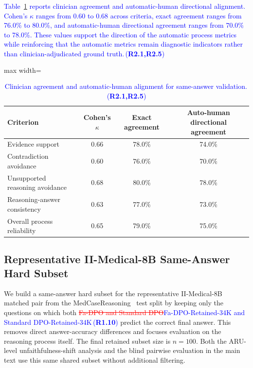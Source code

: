 \documentclass[a4paper,fleqn,doubleblind]{cas-sc}
\DeclareRobustCommand{\deleted}[1]{\textcolor{red}{\sout{#1}}}
\DeclareRobustCommand{\added}[1]{\textcolor{blue}{#1}}
\DeclareRobustCommand{\revtag}[1]{\textcolor{blue}{\scriptsize\,(\textbf{#1})}}
\begin{document}
\added{Table~\ref{tab:same_answer_clinician_alignment} reports clinician agreement and automatic-human directional alignment. Cohen's $\kappa$ ranges from 0.60 to 0.68 across criteria, exact agreement ranges from 76.0\% to 80.0\%, and automatic-human directional agreement ranges from 70.0\% to 78.0\%. These values support the direction of the automatic process metrics while reinforcing that the automatic metrics remain diagnostic indicators rather than clinician-adjudicated ground truth.}\revtag{R2.1,R2.5}

\begin{table}[htbp]
    \centering
    \footnotesize
    \caption{\added{Clinician agreement and automatic-human alignment for same-answer validation.}\revtag{R2.1,R2.5}}
    \label{tab:same_answer_clinician_alignment}
    \begin{adjustbox}{max width=\columnwidth}
    \begingroup\color{blue}
    \begin{tabular}{lccc}
        \toprule
        \textbf{Criterion} & \textbf{Cohen's $\kappa$} & \textbf{Exact agreement} & \textbf{Auto-human directional agreement} \\
        \midrule
        Evidence support & 0.66 & 78.0\% & 74.0\% \\
        Contradiction avoidance & 0.60 & 76.0\% & 70.0\% \\
        Unsupported reasoning avoidance & 0.68 & 80.0\% & 78.0\% \\
        Reasoning-answer consistency & 0.63 & 77.0\% & 73.0\% \\
        Overall process reliability & 0.65 & 79.0\% & 75.0\% \\
        \bottomrule
    \end{tabular}
    \endgroup
    \end{adjustbox}
\end{table}

\subsection{Representative II-Medical-8B Same-Answer Hard Subset}
\label{app:same_answer_subset}

We build a same-answer hard subset for the representative II-Medical-8B~\cite{intelligentinternet2025iimedical8b} matched pair from the MedCaseReasoning~\cite{wu2025medcasereasoning} test split by keeping only the questions on which both \deleted{Fa-DPO and Standard DPO}\added{Fa-DPO-Retained-34K and Standard DPO-Retained-34K}\revtag{R1.10} predict the correct final answer. This removes direct answer-accuracy differences and focuses evaluation on the reasoning process itself. The final retained subset size is $n=100$. Both the ARU-level unfaithfulness-shift analysis and the blind pairwise evaluation in the main text use this same shared subset without additional filtering.
\end{document}
